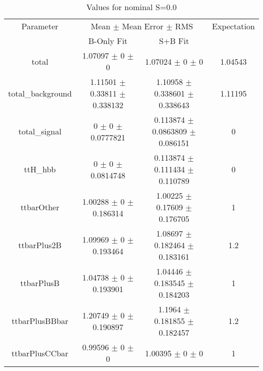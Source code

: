 \begin{table}
\centering
\caption{Values for nominal S=0.0}
\begin{tabular}{cccc}
\toprule
Parameter & \multicolumn{2}{c}{Mean $\pm$ Mean Error $\pm$ RMS} & Expectation\\
 & B-Only Fit & S+B Fit & \\
\midrule
total & \num{1.07097} $\pm$ \num{0} $\pm$ \num{0} & \num{1.07024} $\pm$ \num{0} $\pm$ \num{0} & \num{1.04543}\\
total\_background & \num{1.11501} $\pm$ \num{0.33811} $\pm$ \num{0.338132} & \num{1.10958} $\pm$ \num{0.338601} $\pm$ \num{0.338643} & \num{1.11195}\\
total\_signal & \num{0} $\pm$ \num{0} $\pm$ \num{0.0777821} & \num{0.113874} $\pm$ \num{0.0863809} $\pm$ \num{0.086151} & \num{0}\\
ttH\_hbb & \num{0} $\pm$ \num{0} $\pm$ \num{0.0814748} & \num{0.113874} $\pm$ \num{0.111434} $\pm$ \num{0.110789} & \num{0}\\
ttbarOther & \num{1.00288} $\pm$ \num{0} $\pm$ \num{0.186314} & \num{1.00225} $\pm$ \num{0.17609} $\pm$ \num{0.176705} & \num{1}\\
ttbarPlus2B & \num{1.09969} $\pm$ \num{0} $\pm$ \num{0.193464} & \num{1.08697} $\pm$ \num{0.182464} $\pm$ \num{0.183161} & \num{1.2}\\
ttbarPlusB & \num{1.04738} $\pm$ \num{0} $\pm$ \num{0.193901} & \num{1.04446} $\pm$ \num{0.183545} $\pm$ \num{0.184203} & \num{1}\\
ttbarPlusBBbar & \num{1.20749} $\pm$ \num{0} $\pm$ \num{0.190897} & \num{1.1964} $\pm$ \num{0.181855} $\pm$ \num{0.182457} & \num{1.2}\\
ttbarPlusCCbar & \num{0.99596} $\pm$ \num{0} $\pm$ \num{0} & \num{1.00395} $\pm$ \num{0} $\pm$ \num{0} & \num{1}\\
\bottomrule
\end{tabular}
\end{table}